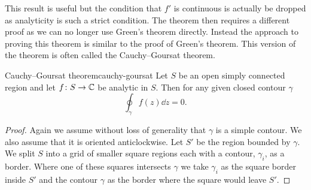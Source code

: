 \documentclass{article}
\begin{document}
    This result is useful but the condition that \(f'\) is continuous is actually be dropped as analyticity is such a strict condition.
    The theorem then requires a different proof as we can no longer use Green's theorem directly.
    Instead the approach to proving this theorem is similar to the proof of Green's theorem.
    This version of the theorem is often called the Cauchy--Goursat theorem.
    \begin{theorem}{Cauchy--Goursat theorem}{cauchy-goursat}
        Let \(S\) be an open simply connected region and let \(f\colon S\to\mathbb{C}\) be analytic in \(S\).
        Then for any given closed contour \(\gamma\)
        \[\oint_{\gamma} f(z) \dd{z} = 0.\]
    \end{theorem}
    \begin{proof}
        Again we assume without loss of generality that \(\gamma\) is a simple contour.
        We also assume that it is oriented anticlockwise.
        Let \(S'\) be the region bounded by \(\gamma\).
        We split \(S\) into a grid of smaller square regions each with a contour, \(\gamma_i\), as a border.
        Where one of these squares intersects \(\gamma\) we take \(\gamma_i\) as the square border inside \(S'\) and the contour \(\gamma\) as the border where the square would leave \(S'\).
        

\end{proof}
\end{document}
